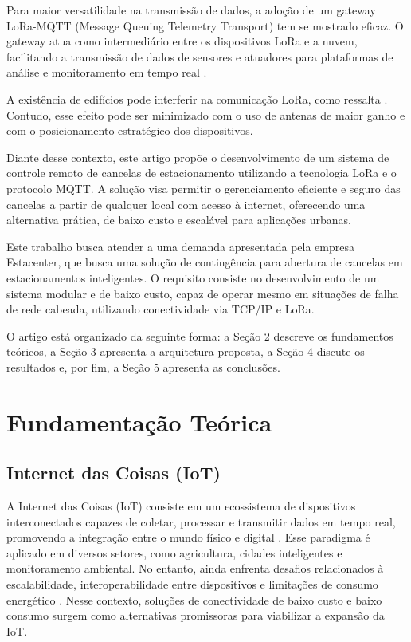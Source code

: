 \documentclass[
article,			%
11pt,				%
twoside,			%
a4paper,			%
section=TITLE,		%
onecolumn,          %
english,			%
brazil,				%
sumario=tradicional
]{abntex2}
\begin{document}
    Para maior versatilidade na transmissão de dados, a adoção de um gateway LoRa-MQTT (Message Queuing Telemetry Transport) tem se mostrado eficaz. O gateway atua como intermediário entre os dispositivos LoRa e a nuvem, facilitando a transmissão de dados de sensores e atuadores para plataformas de análise e monitoramento em tempo real \cite{Bhawiyuga2019}.

    A existência de edifícios pode interferir na comunicação LoRa, como ressalta \cite{lima2023}. Contudo, esse efeito pode ser minimizado com o uso de antenas de maior ganho e com o posicionamento estratégico dos dispositivos.

    Diante desse contexto, este artigo propõe o desenvolvimento de um sistema de controle remoto de cancelas de estacionamento utilizando a tecnologia LoRa e o protocolo MQTT. A solução visa permitir o gerenciamento eficiente e seguro das cancelas a partir de qualquer local com acesso à internet, oferecendo uma alternativa prática, de baixo custo e escalável para aplicações urbanas.

    Este trabalho busca atender a uma demanda apresentada pela empresa Estacenter, que busca uma solução de contingência para abertura de cancelas em estacionamentos inteligentes. O requisito consiste no desenvolvimento de um sistema modular e de baixo custo, capaz de operar mesmo em situações de falha de rede cabeada, utilizando conectividade via TCP/IP e LoRa.

    O artigo está organizado da seguinte forma: a Seção 2 descreve os fundamentos teóricos, a Seção 3 apresenta a arquitetura proposta, a Seção 4 discute os resultados e, por fim, a Seção 5 apresenta as conclusões.


\section{Fundamentação Teórica}

    \subsection{Internet das Coisas (IoT)}
    A Internet das Coisas (IoT) consiste em um ecossistema de dispositivos interconectados capazes de coletar, processar e transmitir dados em tempo real, promovendo a integração entre o mundo físico e digital \cite{lima2023}. Esse paradigma é aplicado em diversos setores, como agricultura, cidades inteligentes e monitoramento ambiental. No entanto, ainda enfrenta desafios relacionados à escalabilidade, interoperabilidade entre dispositivos e limitações de consumo energético \cite{huh2019}. Nesse contexto, soluções de conectividade de baixo custo e baixo consumo surgem como alternativas promissoras para viabilizar a expansão da IoT.
\end{document}
